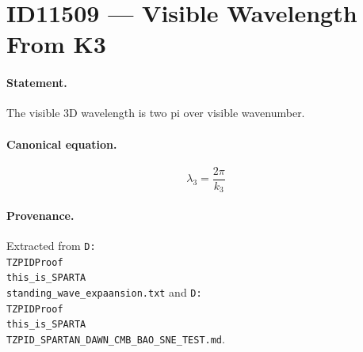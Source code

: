 \section*{ID11509 --- Visible Wavelength From K3}

\paragraph{Statement.}
The visible 3D wavelength is two pi over visible wavenumber.

\paragraph{Canonical equation.}
\[
\lambda_3=\frac{2\pi}{k_3}
\]

\paragraph{Provenance.}
Extracted from \texttt{D:\\TZPIDProof\\this\_is\_SPARTA\\standing\_wave\_expaansion.txt} and \texttt{D:\\TZPIDProof\\this\_is\_SPARTA\\TZPID\_SPARTAN\_DAWN\_CMB\_BAO\_SNE\_TEST.md}.
